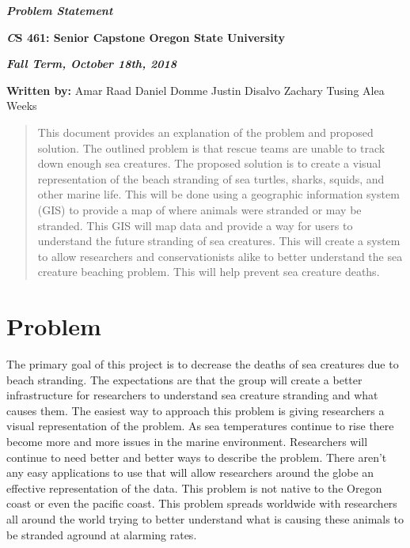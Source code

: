 \documentclass[onecolumn, draftclsnofoot,10pt, compsoc]{IEEEtran}
\def \ClassName{        CS 461: Senior Capstone }
\def \GroupMemberOne{         Amar Raad }
\def \GroupMemberTwo{          Daniel Domme }
\def \GroupMemberThree{          Justin Disalvo }
\def \GroupMemberFour{           Zachary Tusing }
\def \GroupMemberFive{         Alea Weeks }
\begin{document}
    \begin{center}
    \huge\bf{ } 
   
    \large\textbf{\textit{Problem Statement}}\par
     
    
    
    \small{\bf\textit \ClassName Oregon State University}\par
    
    
    {\bf\textit{ Fall Term, October 18th, 2018} }
    
    
   {\small {\bf Written by:} \GroupMemberOne \GroupMemberTwo \GroupMemberThree \GroupMemberFour \GroupMemberFive }
        \end{center}
    \vspace{40pt}
    \begin{abstract}
    This document provides an explanation of the problem and proposed solution. The outlined problem is that rescue teams are unable to track down enough sea creatures. The proposed solution is to create a visual representation of the beach stranding of sea turtles, sharks, squids, and other marine life. This will be done using a geographic information system (GIS) to provide a map of where animals were stranded or may be stranded. This GIS will map data and provide a way for users to understand the future stranding of sea creatures. This will create a system to allow researchers and conservationists alike to better understand the sea creature beaching problem. This will help prevent sea creature deaths.
    \end{abstract}
        
       \pagebreak

       \section{Problem}
          The primary goal of this project is to decrease the deaths of sea creatures due to beach stranding. The expectations are that the group will create a better infrastructure for researchers to understand sea creature stranding and what causes them. The easiest way to approach this problem is giving researchers a visual representation of the problem. As sea temperatures continue to rise there become more and more issues in the marine environment. Researchers will continue to need better and better ways to describe the problem. There aren't any easy applications to use that will allow researchers around the globe an effective representation of the data. This problem is not native to the Oregon coast or even the pacific coast. This problem spreads worldwide with researchers all around the world trying to better understand what is causing these animals to be stranded aground at alarming rates.
\end{document}
